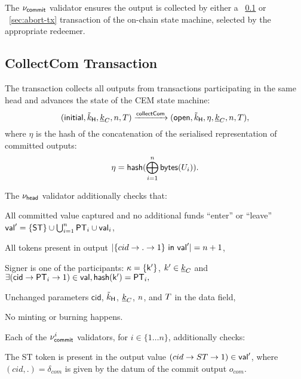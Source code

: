 \noindent The $\nu_\mathsf{commit}$ validator ensures the output is collected by either a \mtxCCom{}~\ref{sec:collect-tx} or \mtxAbort{}~\ref{sec:abort-tx} transaction of the on-chain state machine, selected by the appropriate redeemer.

\subsection{CollectCom Transaction}\label{sec:collect-tx}



The \mtxCCom{} transaction collects all outputs from \mtxCom{} transactions participating in the same head and advances the state of the CEM state machine:
$$
   (\mathsf{initial},\tilde{k}_{\mathsf{H}},\underline{k}_C,n,T) \xrightarrow{\mathsf{collectCom}} (\mathsf{open},\tilde{k}_{\mathsf{H}},\eta,\underline{k}_C,n,T),
$$
where $\eta$ is the hash of the concatenation of the serialised representation of committed outputs:
$$
\eta = \mathsf{hash}(\bigoplus_{i=1}^n \mathsf{bytes}(U_i)).
$$

\noindent The $\nu_\mathsf{head}$ validator additionally checks that:
\begin{menumerate}
  \item All committed value captured and no additional funds ``enter'' or ``leave''
  $\mathsf{val}' = \{\mathsf{ST}\} \cup \bigcup_{i=1}^{n} \mathsf{PT}_{i} \cup \mathsf{val}_{i}$,
  \item All tokens present in output
  $|\{cid \rightarrow . \rightarrow 1\} ~ \mathsf{in} ~ \mathsf{val}'| = n + 1$,
  \item Signer is one of the participants: $\kappa = \{\mathsf{k'}\}$, $k' \in \underline{k}_C$ and
    $
    \exists (\mathsf{cid} \rightarrow \mathsf{PT}_i \rightarrow 1) \in \mathsf{val}, \mathsf{hash}(\mathsf{k'}) = \mathsf{PT}_i,
    $
  \item Unchanged parameters $\mathsf{cid}$, $\tilde{k}_{\mathsf{H}}$, $\underline{k}_C$, $n$, and
  $T$ in the data field,
  \item No minting or burning happens.
\end{menumerate}

\noindent Each of the $\nu_\mathsf{commit}^i$ validators, for $i \in \{ 1\dots n\}$, additionally checks:
\begin{menumerate}
    \item The ST token is present in the output value $(cid \rightarrow ST \rightarrow 1) \in \mathsf{val}'$, where $(cid,.) = \delta_{com}$ is given by the datum of the commit output $o_{com}$.
\end{menumerate}

